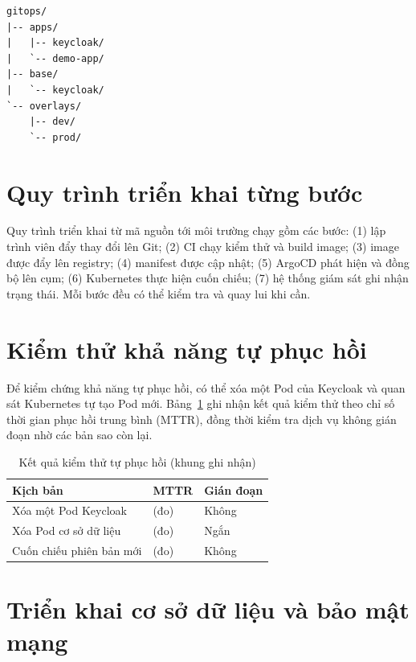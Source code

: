 \begin{lstlisting}[caption={Cau truc kho GitOps},label={lst:gitrepo}]
gitops/
|-- apps/
|   |-- keycloak/
|   `-- demo-app/
|-- base/
|   `-- keycloak/
`-- overlays/
    |-- dev/
    `-- prod/
\end{lstlisting}

\section{Quy trình triển khai từng bước}
\label{sec:quytrinh}

Quy trình triển khai từ mã nguồn tới môi trường chạy gồm các bước: (1) lập
trình viên đẩy thay đổi lên Git; (2) CI chạy kiểm thử và build image; (3) image
được đẩy lên registry; (4) manifest được cập nhật; (5) ArgoCD phát hiện và đồng
bộ lên cụm; (6) Kubernetes thực hiện cuốn chiếu; (7) hệ thống giám sát ghi nhận
trạng thái. Mỗi bước đều có thể kiểm tra và quay lui khi cần.

\section{Kiểm thử khả năng tự phục hồi}
\label{sec:recovery}

Để kiểm chứng khả năng tự phục hồi, có thể xóa một Pod của Keycloak và quan sát
Kubernetes tự tạo Pod mới. Bảng~\ref{tab:mttr} ghi nhận kết quả kiểm thử theo
chỉ số thời gian phục hồi trung bình (MTTR), đồng thời kiểm tra dịch vụ không
gián đoạn nhờ các bản sao còn lại.

\begin{table}[htbp]
\centering
\caption{Kết quả kiểm thử tự phục hồi (khung ghi nhận)}
\label{tab:mttr}
\small
\begin{tabular}{p{5.4cm} p{3.2cm} p{3.8cm}}
\toprule
\textbf{Kịch bản} & \textbf{MTTR} & \textbf{Gián đoạn}\\
\midrule
Xóa một Pod Keycloak & (đo) & Không\\
Xóa Pod cơ sở dữ liệu & (đo) & Ngắn\\
Cuốn chiếu phiên bản mới & (đo) & Không\\
\bottomrule
\end{tabular}
\end{table}

\section{Triển khai cơ sở dữ liệu và bảo mật mạng}
\label{sec:postgres-k8s}

